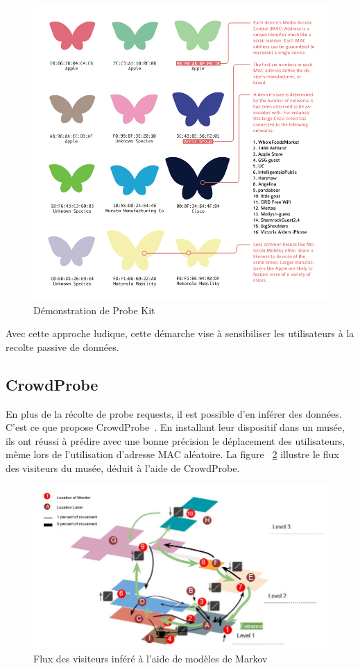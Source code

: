 \begin{figure}[H]
	\centering
	\includegraphics[width=12cm]{images/probekit.png}
	\caption{Démonstration de Probe Kit}
	\label{fig:probekit}
\end{figure}

Avec cette approche ludique, cette démarche vise à sensibiliser les utilisateurs à la recolte passive de données.

\subsection{CrowdProbe}

En plus de la récolte de probe requests, il est possible d'en inférer des données. C'est ce que propose CrowdProbe~\cite{crowdprobe}. 
En installant leur dispositif dans un musée, ils ont réussi à prédire avec une bonne précision le déplacement des utilisateurs, même lors de l'utilisation d'adresse MAC aléatoire.
La figure ~\ref{fig:crowdprobe} illustre le flux des visiteurs du musée, déduit à l'aide de CrowdProbe.
\begin{figure}[H]
	\centering
	\includegraphics[width=12cm]{images/crowd-probe.jpeg}
	\caption{Flux des visiteurs inféré à l'aide de modèles de Markov}
	\label{fig:crowdprobe}
\end{figure}

